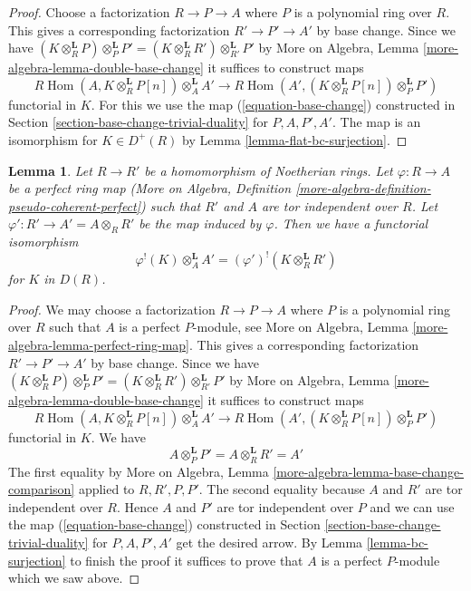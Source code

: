 \documentclass{stacks-project}
\theoremstyle{plain}
\newtheorem{lemma}[subsection]{Lemma}
\theoremstyle{definition}
\theoremstyle{remark}
\numberwithin{equation}{subsection}
\def\Hom{\mathop{\mathrm{Hom}}\nolimits}
\begin{document}
\begin{proof}
Choose a factorization $R \to P \to A$ where $P$ is a polynomial ring over $R$.
This gives a corresponding factorization $R' \to P' \to A'$ by base change.
Since we have $(K \otimes_R^\mathbf{L} P) \otimes_P^\mathbf{L} P' =
(K \otimes_R^\mathbf{L} R') \otimes_{R'}^\mathbf{L} P'$
by More on Algebra, Lemma \ref{more-algebra-lemma-double-base-change}
it suffices to construct maps
$$
R\Hom(A, K \otimes_R^\mathbf{L} P[n]) \otimes_A^\mathbf{L} A'
\longrightarrow
R\Hom(A', (K \otimes_R^\mathbf{L} P[n]) \otimes_P^\mathbf{L} P')
$$
functorial in $K$. For this we use the map (\ref{equation-base-change})
constructed in Section \ref{section-base-change-trivial-duality}
for $P, A, P', A'$.
The map is an isomorphism for $K \in D^+(R)$ by
Lemma \ref{lemma-flat-bc-surjection}.
\end{proof}

\begin{lemma}
\label{lemma-bc}
Let $R \to R'$ be a homomorphism of Noetherian rings.
Let $\varphi : R \to A$ be a perfect ring map
(More on Algebra, Definition
\ref{more-algebra-definition-pseudo-coherent-perfect})
such that $R'$ and $A$ are tor independent over $R$.
Let $\varphi' : R' \to A' = A \otimes_R R'$ be the map induced by $\varphi$.
Then we have a functorial isomorphism
$$
\varphi^!(K) \otimes_A^\mathbf{L} A' =
(\varphi')^!(K \otimes_R^\mathbf{L} R')
$$
for $K$ in $D(R)$.
\end{lemma}

\begin{proof}
We may choose a factorization $R \to P \to A$ where $P$
is a polynomial ring over $R$ such that $A$ is a perfect $P$-module, see
More on Algebra, Lemma \ref{more-algebra-lemma-perfect-ring-map}.
This gives a corresponding factorization $R' \to P' \to A'$ by base change.
Since we have $(K \otimes_R^\mathbf{L} P) \otimes_P^\mathbf{L} P' =
(K \otimes_R^\mathbf{L} R') \otimes_{R'}^\mathbf{L} P'$
by More on Algebra, Lemma \ref{more-algebra-lemma-double-base-change}
it suffices to construct maps
$$
R\Hom(A, K \otimes_R^\mathbf{L} P[n]) \otimes_A^\mathbf{L} A'
\longrightarrow
R\Hom(A', (K \otimes_R^\mathbf{L} P[n]) \otimes_P^\mathbf{L} P')
$$
functorial in $K$. We have
$$
A \otimes_P^\mathbf{L} P' = A \otimes_R^\mathbf{L} R' = A'
$$
The first equality by
More on Algebra, Lemma \ref{more-algebra-lemma-base-change-comparison}
applied to $R, R', P, P'$. The second equality because
$A$ and $R'$ are tor independent over $R$. Hence $A$ and $P'$ are
tor independent over $P$ and we can use the map (\ref{equation-base-change})
constructed in Section \ref{section-base-change-trivial-duality} for
$P, A, P', A'$
get the desired arrow. By Lemma \ref{lemma-bc-surjection}
to finish the proof it suffices to prove that $A$ is a perfect $P$-module
which we saw above.
\end{proof}
\end{document}
